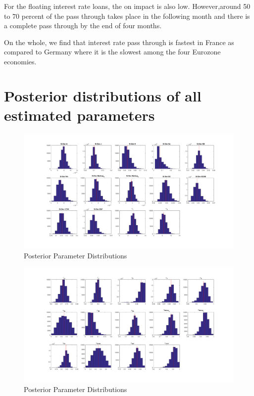 \documentclass[12pt]{article}
\numberwithin{equation}{section}
\begin{document}
\begin{appendix}
For the floating interest rate loans, the on impact is also low. However,around 50 to 70 percent of the pass through takes place in the following month and there is a complete pass through by the end of four months.

On the whole, we find that interest rate pass through is fastest in France as compared to Germany where it is the slowest among the four Eurozone economies.

\section{Posterior distributions of all estimated parameters}
\label{app_posteriorDist}

\begin{figure}[h]
\centering
\caption{Posterior Parameter Distributions}
\label{app_post1}
\includegraphics[scale=0.45]{posteriordistributions1.pdf}
\end{figure}

\begin{figure}[h]
\centering
\caption{Posterior Parameter Distributions}
\label{app_post2}
\includegraphics[scale=0.45]{posteriordistributions2.pdf}
\end{figure}


\end{appendix}
\end{document}
